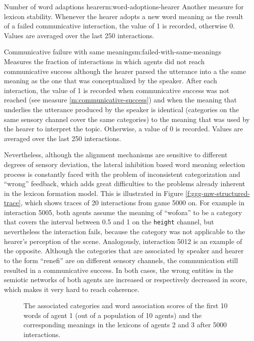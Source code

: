 \begin{measure}[b]{Number of word adaptions
    hearer}{m:word-adoptions-hearer}
  Another measure for lexicon stability. Whenever the hearer adopts a
  new word meaning as the result of a failed communicative
  interaction, the value of 1 is recorded, otherwise 0. Values are
  averaged over the last 250 interactions.
\end{measure}

\begin{measure}[b]{Communicative failure with same
    meanings}{m:failed-with-same-meanings}
  Measures the fraction of interactions in which agents did not reach
  communicative success although the hearer parsed the utterance into
  a the same meaning as the one that was conceptualized by the
  speaker. After each interaction, the value of 1 is recorded when
  communicative success was not reached (see measure
  \ref{m:communicative-success}) and when the meaning that underlies
  the utterance produced by the speaker is identical (categories on
  the same sensory channel cover the same categories) to the meaning
  that was used by the hearer to interpret the topic. Otherwise, a
  value of 0 is recorded. Values are averaged over the last 250
  interactions.
\end{measure}


Nevertheless, although the alignment mechanisms are sensitive to
different degrees of sensory deviation, the lateral inhibition based
word meaning selection process is constantly faced with the problem of
inconsistent categorization and ``wrong'' feedback, which adds great
difficulties to the problems already inherent in the lexicon formation
model. This is illustrated in Figure \ref{f:ggg-mw-structured-trace},
which shows traces of 20 interactions from game 5000 on. For example
in interaction 5005, both agents assume the meaning of ``wofoza'' to
be a category that covers the interval between 0.5 and 1 on the
\texttt{height} channel, but nevertheless the interaction fails,
because the category was not applicable to the hearer's perception of
the scene. Analogously, interaction 5012 is an example of the
opposite. Although the categories that are associated by speaker and
hearer to the form ``renefi'' are on different sensory channels, the
communication still resulted in a communicative success. In both
cases, the wrong entities in the semiotic networks of both agents are
increased or respectively decreased in score, which makes it very hard
to reach coherence.


\begin{figure}[t]
  
  \caption{The associated categories and word association scores of
    the first 10 words of agent 1 (out of a population of 10 agents)
    and the corresponding meanings in the lexicons of agents 2 and 3
    after 5000 interactions. }
  \label{f:ggg-mw-structured-lexicon-forms-5000}
\end{figure}



